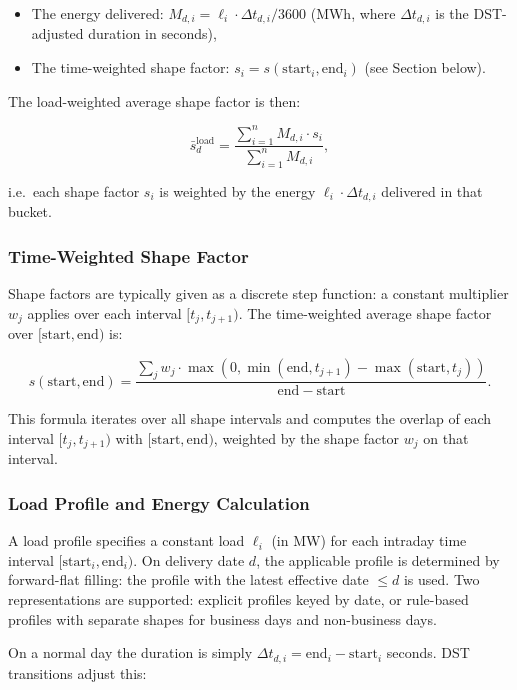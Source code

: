 \begin{itemize}
\item The energy delivered: $M_{d,i} = \ell_i \cdot \Delta t_{d,i} / 3600$ (MWh, where $\Delta t_{d,i}$ is the DST-adjusted duration in seconds),
\item The time-weighted shape factor: $s_i = s(\mathrm{start}_i, \mathrm{end}_i)$ (see Section below).
\end{itemize}

The load-weighted average shape factor is then:

$$
\bar{s}_d^{\mathrm{load}} = \frac{\sum_{i=1}^{n} M_{d,i} \cdot s_i}{\sum_{i=1}^{n} M_{d,i}},
$$

i.e.\ each shape factor $s_i$ is weighted by the energy $\ell_i \cdot \Delta t_{d,i}$ delivered in that bucket.

\subsubsection{Time-Weighted Shape Factor}

Shape factors are typically given as a discrete step function: a constant multiplier $w_j$ applies over each interval $[t_j, t_{j+1})$. The time-weighted average shape factor over $[\mathrm{start}, \mathrm{end})$ is:

$$
s(\mathrm{start}, \mathrm{end}) = \frac{\sum_{j} w_j \cdot \max(0, \min(\mathrm{end}, t_{j+1}) - \max(\mathrm{start}, t_j))}{\mathrm{end} - \mathrm{start}}.
$$

This formula iterates over all shape intervals and computes the overlap of each interval $[t_j, t_{j+1})$ with $[\mathrm{start}, \mathrm{end})$, weighted by the shape factor $w_j$ on that interval.

\subsubsection{Load Profile and Energy Calculation}

A load profile specifies a constant load $\ell_i$ (in MW) for each intraday time interval $[\mathrm{start}_i, \mathrm{end}_i)$. On delivery date $d$, the applicable profile is determined by forward-flat filling: the profile with the latest effective date $\leq d$ is used. Two representations are supported: explicit profiles keyed by date, or rule-based profiles with separate shapes for business days and non-business days.

On a normal day the duration is simply $\Delta t_{d,i} = \mathrm{end}_i - \mathrm{start}_i$ seconds. DST transitions adjust this:

